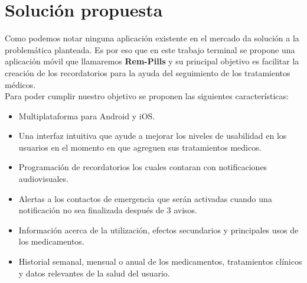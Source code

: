 \section{Solución propuesta}
Como podemos notar ninguna aplicación existente en el mercado da solución a la problemática planteada.
Es por eso que en este trabajo terminal se propone una aplicación móvil que llamaremos \textbf{Rem-Pills} y su principal objetivo es facilitar la creación de los recordatorios para la ayuda del seguimiento de los tratamientos médicos.\\
Para poder cumplir nuestro objetivo se proponen las siguientes características:
\begin{itemize}
	\item Multiplataforma para Android y iOS.
	
	\item Una interfaz intuitiva que ayude a mejorar los niveles de usabilidad en los usuarios en el momento en que agreguen sus tratamientos medicos.
	
	\item Programación de recordatorios los cuales contaran con notificaciones audiovisuales.
	
	\item Alertas a los contactos de emergencia que serán activadas cuando una notificación no sea finalizada después de 3 avisos.
	
	\item Información acerca de la utilización, efectos secundarios y principales usos de los medicamentos.
	
	\item Historial semanal, mensual o anual de los medicamentos, tratamientos clínicos y datos relevantes de la salud del usuario.
	
\end{itemize}



%	
%
%	
%	
%	
%	
%	

